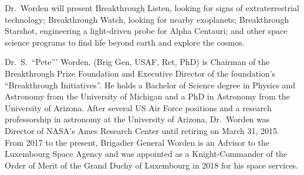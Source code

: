 \documentclass[a4paper,parskip,10pt]{scrartcl}
\begin{document}
    \vfill

    \begin{tcolorbox}[
        enhanced,
        title={Keynote Lecture 1: Pete Worden (Breakthrough Initiatives) \\ Life in the Universe and Private Sector Space Science Initiatives},
        sharp corners,
        colbacktitle=thistrack,
        fonttitle=\large\mediumfont,
        boxsep=0pt,
        boxrule=0pt,
        left*=0pt,
        lefttitle=4mm,
        toptitle=4mm,
        bottomtitle=4mm,
        top=0pt,
        bottom=0pt,
        sidebyside,
        sidebyside align=center,
        lefthand width=6cm,
        segmentation empty,
    ]%
        
        \tcblower

        \setlength{\parskip}{1ex}
        
        \vspace{1ex}
        Dr.~Worden will present Breakthrough Listen, looking for signs of extraterrestrial technology; Breakthrough Watch, looking for nearby exoplanets; Breakthrough Starshot, engineering a light-driven probe for Alpha Centauri; and other space science programs to find life beyond earth and explore the cosmos.

        {
            \small
            \color{white!20!black}
            Dr.~S.~``Pete''' Worden, (Brig Gen, USAF, Ret, PhD) is Chairman of the Breakthrough Prize Foundation and Executive Director of the foundation's ``Breakthrough Initiatives''. He holds a Bachelor of Science degree in Physics and Astronomy from the University of Michigan and a PhD in Astronomy from the University of Arizona. After several US Air Force positions and a research professorship in astronomy at the University of Arizona, Dr.~Worden was Director of NASA's Ames Research Center until retiring on March 31, 2015. From 2017 to the present, Brigadier General Worden is an Advisor to the Luxembourg Space Agency and was appointed as a Knight-Commander of the Order of Merit of the Grand Duchy of Luxembourg in 2018 for his space services.}

        \vspace{2ex}
    \end{tcolorbox}
\end{document}
